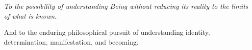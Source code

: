 

\cleardoublepage
\thispagestyle{empty}

\vspace*{\fill}

\begin{center}

    {\large\itshape
    To the possibility of understanding Being
    without reducing its reality to the limits of what is known.
    }

    \vspace{2em}

    {\normalsize
    And to the enduring philosophical pursuit of understanding
    identity, determination, manifestation, and becoming.
    }

\end{center}

\vspace*{\fill}

\cleardoublepage

